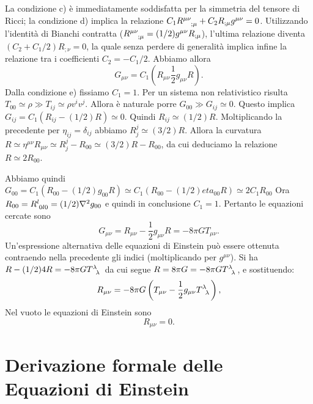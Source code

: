 La condizione c) è immediatamente soddisfatta per la simmetria del tensore di
Ricci; la condizione d) implica la relazione $C_1 \tensor{R}{^{\mu \nu}_{;\mu}}
+ C_2 R_{;\mu} g^{\mu \nu} = 0$.  Utilizzando l'identità di Bianchi contratta
($\tensor{R}{^{\mu \nu}_{; \mu}} = (1/2) g^{\mu \nu} R_{; \mu}$), l'ultima
relazione diventa $(C_2 + C_1/2) R_{; \nu} =0$, la quale senza perdere di
generalità implica infine la relazione tra i coefficienti $C_2 = -C_1/2$.
Abbiamo allora
\begin{equation}
  G_{\mu \nu} = C_1 \left( R_{\mu \nu} \frac{1}{2} g_{\mu \nu} R \right).
\end{equation}
Dalla condizione e) fissiamo $C_1=1$.  Per un sistema non relativistico risulta
$T_{00} \simeq \rho \gg T_{ij} \simeq \rho v^i v^j$. Allora è naturale porre
$G_{00} \gg G_{ij} \simeq 0$.  Questo implica $G_{ij} = C_1 (R_{ij} -(1/2) R)
\simeq 0$.  Quindi $R_{ij} \simeq (1/2) R$.  Moltiplicando la precedente per
$\eta_{ij}=\delta_{ij}$ abbiamo $R^j_j \simeq (3/2) R$.  Allora la curvatura $R
\simeq \eta^{\mu \nu} R_{\mu \nu} \simeq R^j_j - R_{00} \simeq (3/2)R-R_{00}$,
da cui deduciamo la relazione $R \simeq 2 R_{00}$.

Abbiamo quindi $G_{00} = C_1 (R_{00}-(1/2) g_{00} R) \simeq C_1 (R_{00}-(1/2)
eta_{00} R) \simeq 2 C_1 R_{00}$ Ora $R_{00} = \tensor{R}{^{l}_{0l0}} = (1/2)
\nabla^2 g_{00}$ e quindi in conclusione $C_1=1$.  Pertanto le equazioni cercate
sono
\begin{equation}
  G_{\mu \nu} = R_{\mu \nu} - \frac{1}{2} g_{\mu \nu} R = -8 \pi G T_{\mu\nu}.
\end{equation}
Un'espressione alternativa delle equazioni di Einstein può essere ottenuta
contraendo nella precedente gli indici (moltiplicando per $g^{\mu \nu}$).  Si ha
$R-(1/2) 4 R = -8 \pi G \tensor{T}{^{\lambda}_{\lambda}}$ da cui segue $R= 8 \pi
G = -8 \pi G \tensor{T}{^{\lambda}_{\lambda}}$, e sostituendo:
\begin{equation}
  R_{\mu \nu}= -8 \pi G \left( T_{\mu \nu} - \frac{1}{2} g_{\mu \nu}
    \tensor{T}{^{\lambda}_{\lambda}} \right),
\end{equation}
Nel vuoto le equazioni di Einstein sono
\begin{equation}
  R_{\mu \nu}=0.
\end{equation}

\section{Derivazione formale delle Equazioni di Einstein}
\label{sec:equazioni-einstein}

